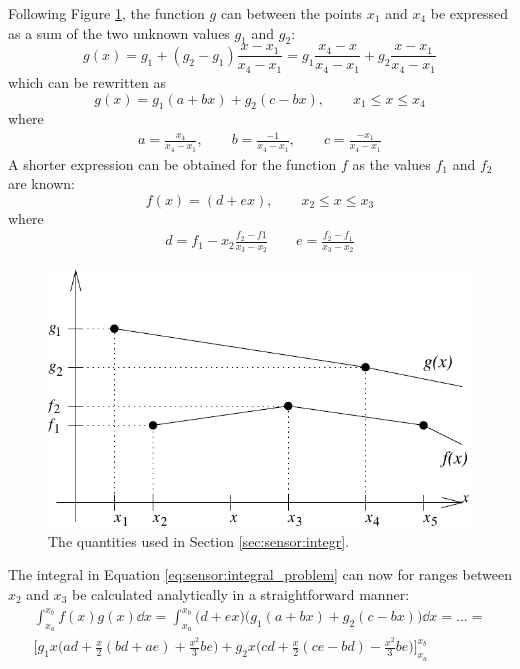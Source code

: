  Following Figure \ref{fig:sensor:vecintegr}, the function $g$ can between
 the points $x_1$ and $x_4$ be expressed as a sum of the two unknown
 values $g_1$ and $g_2$:
 \begin{equation}
   g(x) = g_1 + (g_2-g_1)\frac{x-x_1}{x_4-x_1} =
           g_1 \frac{x_4-x}{x_4-x_1} + g_2\frac{x-x_1}{x_4-x_1}
 \end{equation}
 which can be rewritten as
 \begin{equation}
   g(x) = g_1(a+bx)+g_2(c-bx), \qquad x_1 \leq x \leq x_4
 \end{equation}
 where
 \begin{eqnarray}
    a=\frac{x_4}{x_4-x_1}, \qquad b=\frac{-1}{x_4-x_1}, \qquad 
    c=\frac{-x_1}{x_4-x_1}   \nonumber
 \end{eqnarray} 
 A shorter expression can be obtained for the function $f$ as the
 values $f_1$ and $f_2$ are known:
 \begin{equation}
   f(x) = (d+ex), \qquad x_2 \leq x \leq x_3
 \end{equation}
 where 
 \begin{eqnarray}
    d=f_1-x_2\frac{f_2-f1}{x_3-x_2} \qquad e=\frac{f_2-f_1}{x_3-x_2} \nonumber
 \end{eqnarray}
 \begin{figure}[tb]
    \begin{center}
      \includegraphics*{Figs/vecintegr}
      \caption{The quantities used in Section \ref{sec:sensor:integr}.}  
      \label{fig:sensor:vecintegr} 
    \end{center} 
 \end{figure}
 The integral in Equation \ref{eq:sensor:integral_problem} can now for
 ranges between $x_2$ and $x_3$ be calculated analytically in a
 straightforward manner:
 \begin{eqnarray}
    \int_{x_a}^{x_b}{f(x)g(x) \dd x} =
    \int_{x_a}^{x_b}{\big(d+ex\big)\big(g_1(a+bx)+g_2(c-bx)\big) \dd x}  
    =\dots= \nonumber\\
    \bigg[ g_1x\Big(ad+\frac{x}{2}(bd+ae)+\frac{x^2}{3}be\Big) + 
           g_2x\Big(cd+\frac{x}{2}(ce-bd)-\frac{x^2}{3}be \Big)
           \bigg]_{x_a}^{x_b}
    \label{eq:sensor:integr_weights}
 \end{eqnarray}
